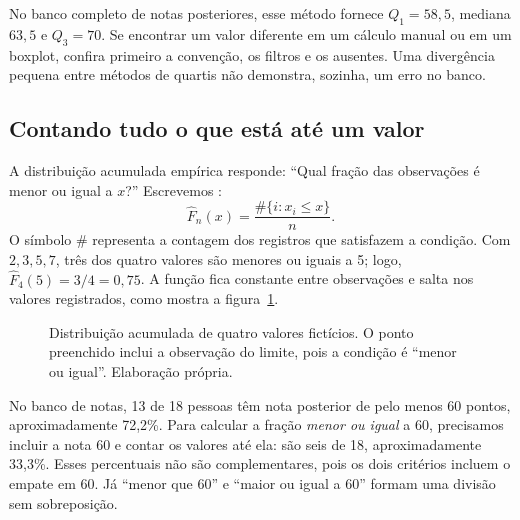 No banco completo de notas posteriores, esse método fornece $Q_1=58{,}5$, mediana $63{,}5$ e $Q_3=70$. Se encontrar um valor diferente em um cálculo manual ou em um boxplot, confira primeiro a convenção, os filtros e os ausentes. Uma divergência pequena entre métodos de quartis não demonstra, sozinha, um erro no banco.

\subsection{Contando tudo o que está até um valor}

A distribuição acumulada empírica responde: ``Qual fração das observações é menor ou igual a $x$?'' Escrevemos \parencite{RAcumuladaEmpirica}:
\[
 \widehat F_n(x)=\frac{\#\{i:x_i\leq x\}}{n}.
\]
O símbolo $\#$ representa a contagem dos registros que satisfazem a condição. Com $2,3,5,7$, três dos quatro valores são menores ou iguais a 5; logo, $\widehat F_4(5)=3/4=0{,}75$. A função fica constante entre observações e salta nos valores registrados, como mostra a figura~\ref{fig:distribuicao-acumulada}.

\begin{figure}[H]
\centering
{}
\caption{Distribuição acumulada de quatro valores fictícios. O ponto preenchido inclui a observação do limite, pois a condição é ``menor ou igual''. Elaboração própria.}
\label{fig:distribuicao-acumulada}
\end{figure}

No banco de notas, 13 de 18 pessoas têm nota posterior de pelo menos 60 pontos, aproximadamente 72,2\%. Para calcular a fração \emph{menor ou igual} a 60, precisamos incluir a nota 60 e contar os valores até ela: são seis de 18, aproximadamente 33,3\%. Esses percentuais não são complementares, pois os dois critérios incluem o empate em 60. Já ``menor que 60'' e ``maior ou igual a 60'' formam uma divisão sem sobreposição.

